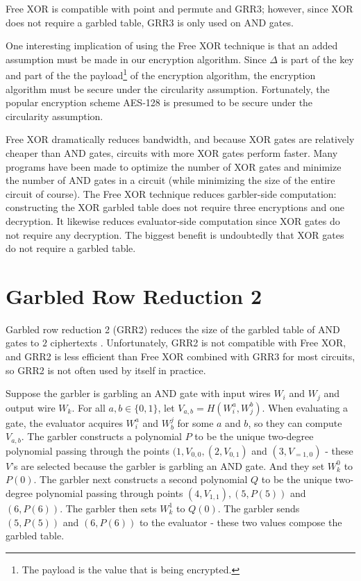 Free XOR is compatible with point and permute and GRR3; however, since XOR does not require a garbled table, GRR3 is only used on AND gates.

One interesting implication of using the Free XOR technique is that an added assumption must be made in our encryption algorithm.
Since $\Delta$ is part of the key and part of the the payload\footnote{The payload is the value that is being encrypted.} of the encryption algorithm, the encryption algorithm must be secure under the circularity assumption.
Fortunately, the popular encryption scheme AES-128 is presumed to be secure under the circularity assumption.

Free XOR dramatically reduces bandwidth, and because XOR gates are relatively cheaper than AND gates, circuits with more XOR gates perform faster.
Many programs have been made to optimize the number of XOR gates and minimize the number of AND gates in a circuit (while minimizing the size of the entire circuit of course).
The Free XOR technique reduces garbler-side computation: constructing the XOR garbled table does not require three encryptions and one decryption.
It likewise reduces evaluator-side computation  since XOR gates do not require any decryption. 
The biggest benefit is undoubtedly that XOR gates do not require a garbled table.

\section{Garbled Row Reduction 2}
Garbled row reduction 2 (GRR2) reduces the size of the garbled table of AND gates to $2$ ciphertexts \cite{grr}.
Unfortunately, GRR2 is not compatible with Free XOR, and GRR2 is less efficient than Free XOR combined with GRR3 for most circuits, so GRR2 is not often used by itself in practice.

Suppose the garbler is garbling an AND gate with input wires $W_i$ and $W_j$ and output wire $W_k$.
For all $a,b \in \{0,1\}$, let $V_{a,b} = H(W_i^a, W_j^b)$.
When evaluating a gate, the evaluator acquires $W_i^a$ and $W_b^j$ for some $a$ and $b$, so they can compute $V_{a,b}$.
The garbler constructs a polynomial $P$ to be the unique two-degree polynomial passing through the points $(1, V_{0,0}, (2, V_{0,1})$ and $(3, V_{=1,0})$ - these $V$'s are selected because the garbler is garbling an AND gate.
And they set $W_k^0$ to $P(0)$.
The garbler next constructs a second polynomial $Q$ to be the unique two-degree polynomial passing through points $(4, V_{1,1}), (5, P(5))$ and  $(6, P(6))$.
The garbler then sets $W_k^1$ to $Q(0)$.
The garbler sends $(5, P(5))$ and $(6, P(6))$ to the evaluator - these two values compose the garbled table.

